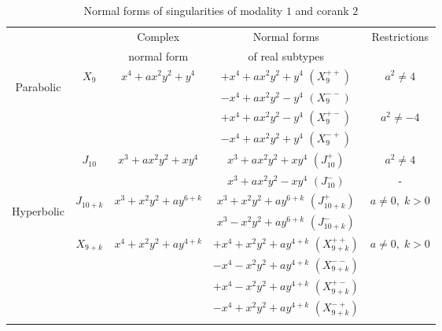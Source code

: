 \documentclass[noend]{amsproc}
\theoremstyle{definition}
\begin{document}
\begin{table}[tp]
\centering
\caption{Normal forms of singularities of modality $1$ and corank $2$}
\label{tab:normal_forms}
\begin{tabular}{|c|c|c|c|c|}
\hline

\multicolumn{1}{|c}{}
 & & Complex     & Normal forms     & \multirow{2}{*}{Restrictions} \\
\multicolumn{1}{|c}{}
 & & normal form & of real subtypes &                               \\
\hline\hline


\multirow{6}{*}{\begin{sideways}Parabolic\end{sideways}}

& \multirow{4}{*}{$X_9$} & \multirow{4}{*}{$x^4+ax^2y^2+y^4$}
  & $+x^4+ax^2y^2+y^4$ $(X_9^{++})$ & \multirow{2}{*}{$a^2\neq4$} \\\cline{4-4}
&&& $-x^4+ax^2y^2-y^4$ $(X_9^{--})$ &                             \\\cline{4-5}
&&& $+x^4+ax^2y^2-y^4$ $(X_9^{+-})$ & \multirow{2}{*}{$a^2\neq-4$}\\\cline{4-4}
&&& $-x^4+ax^2y^2+y^4$ $(X_9^{-+})$ &                             \\\cline{2-5}

& \multirow{2}{*}{$J_{10}$} & \multirow{2}{*}{$x^3+ax^2y^2+xy^4$}
  & $x^3+ax^2y^2+xy^4$ $(J_{10}^+)$ & $a^2 \neq 4$ \\ \cline{4-5}
&&& $x^3+ax^2y^2-xy^4$ $(J_{10}^-)$ & -            \\ \hline


\multirow{12}{*}{\begin{sideways}Hyperbolic\end{sideways}}

& \multirow{2}{*}{$J_{10+k}$} & \multirow{2}{*}{$x^3+x^2y^2+ay^{6+k}$}
  & $x^3+x^2y^2+ay^{6+k}$ $(J_{10+k}^+)$
      & \multirow{2}{*}{$a \neq 0,\; k > 0$} \\ \cline{4-4}
&&& $x^3-x^2y^2+ay^{6+k}$ $(J_{10+k}^-)$ &   \\ \cline{2-5}

& \multirow{4}{*}{$X_{9+k}$} & \multirow{4}{*}{$x^4+x^2y^2+ay^{4+k}$}
  & $+x^4+x^2y^2+ay^{4+k}$ $(X_{9+k}^{++})$
      & \multirow{4}{*}{$a \neq 0,\; k > 0$}  \\ \cline{4-4}
&&& $-x^4-x^2y^2+ay^{4+k}$ $(X_{9+k}^{--})$ & \\ \cline{4-4}
&&& $+x^4-x^2y^2+ay^{4+k}$ $(X_{9+k}^{+-})$ & \\ \cline{4-4}
&&& $-x^4+x^2y^2+ay^{4+k}$ $(X_{9+k}^{-+})$ & \\ \cline{2-5}


\end{tabular}
\end{table}
\end{document}
